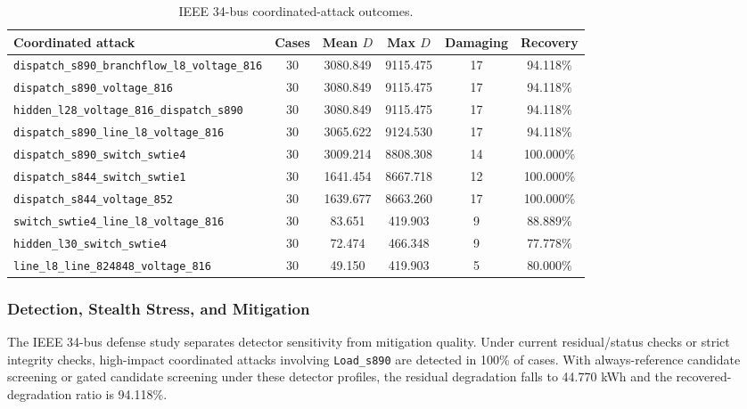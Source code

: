 \begin{table}[t]
\centering
\caption{IEEE 34-bus coordinated-attack outcomes.}
\label{tab:ieee34_coordinated}
\scriptsize
\begin{tabular}{lccccc}
\hline
Coordinated attack & Cases & Mean $D$ & Max $D$ & Damaging & Recovery \\
\hline
\texttt{dispatch\_s890\_branchflow\_l8\_voltage\_816} & 30 & 3080.849 & 9115.475 & 17 & 94.118\% \\
\texttt{dispatch\_s890\_voltage\_816} & 30 & 3080.849 & 9115.475 & 17 & 94.118\% \\
\texttt{hidden\_l28\_voltage\_816\_dispatch\_s890} & 30 & 3080.849 & 9115.475 & 17 & 94.118\% \\
\texttt{dispatch\_s890\_line\_l8\_voltage\_816} & 30 & 3065.622 & 9124.530 & 17 & 94.118\% \\
\texttt{dispatch\_s890\_switch\_swtie4} & 30 & 3009.214 & 8808.308 & 14 & 100.000\% \\
\texttt{dispatch\_s844\_switch\_swtie1} & 30 & 1641.454 & 8667.718 & 12 & 100.000\% \\
\texttt{dispatch\_s844\_voltage\_852} & 30 & 1639.677 & 8663.260 & 17 & 100.000\% \\
\texttt{switch\_swtie4\_line\_l8\_voltage\_816} & 30 & 83.651 & 419.903 & 9 & 88.889\% \\
\texttt{hidden\_l30\_switch\_swtie4} & 30 & 72.474 & 466.348 & 9 & 77.778\% \\
\texttt{line\_l8\_line\_824848\_voltage\_816} & 30 & 49.150 & 419.903 & 5 & 80.000\% \\
\hline
\end{tabular}
\end{table}

\subsubsection{Detection, Stealth Stress, and Mitigation}
\label{subsubsec:ieee34_defense}

The IEEE 34-bus defense study separates detector sensitivity from mitigation quality. Under current residual/status checks or strict integrity checks, high-impact coordinated attacks involving \texttt{Load\_s890} are detected in 100\% of cases. With always-reference candidate screening or gated candidate screening under these detector profiles, the residual degradation falls to 44.770 kWh and the recovered-degradation ratio is 94.118\%.

